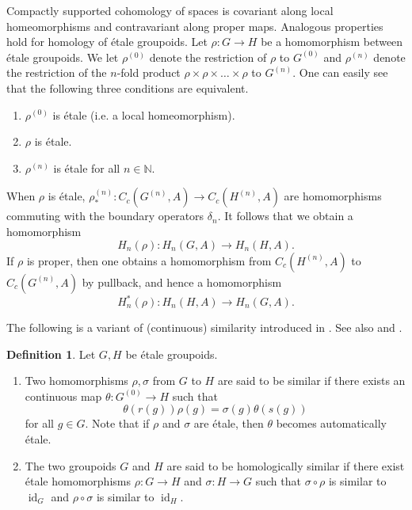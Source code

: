 \documentclass[11pt]{article}
\theoremstyle{definition}
\newtheorem{df}[thm]{Definition}
\newcommand{\id}{\operatorname{id}}
\newcommand{\N}{\mathbb{N}}
\begin{document}
Compactly supported cohomology of spaces is 
covariant along local homeomorphisms and contravariant along proper maps. 
Analogous properties hold for homology of \'etale groupoids. 
Let $\rho:G\to H$ be a homomorphism between \'etale groupoids. 
We let $\rho^{(0)}$ denote the restriction of $\rho$ to $G^{(0)}$ and 
$\rho^{(n)}$ denote the restriction of the $n$-fold product 
$\rho\times\rho\times\dots\times\rho$ to $G^{(n)}$. 
One can easily see that the following three conditions are equivalent. 
\begin{enumerate}
\item $\rho^{(0)}$ is \'etale (i.e. a local homeomorphism). 
\item $\rho$ is \'etale. 
\item $\rho^{(n)}$ is \'etale for all $n\in\N$. 
\end{enumerate}
When $\rho$ is \'etale, 
$\rho^{(n)}_*:C_c(G^{(n)},A)\to C_c(H^{(n)},A)$ are homomorphisms 
commuting with the boundary operators $\delta_n$. 
It follows that we obtain a homomorphism 
\[
H_n(\rho):H_n(G,A)\to H_n(H,A). 
\]
If $\rho$ is proper, then 
one obtains a homomorphism from $C_c(H^{(n)},A)$ to $C_c(G^{(n)},A)$ 
by pullback, and hence a homomorphism 
\[
H^*_n(\rho):H_n(H,A)\to H_n(G,A). 
\]

The following is a variant of (continuous) similarity introduced in \cite{R1}. 
See also \cite[Proposition 3.8]{CM} and \cite[2.1.3]{FHK}. 

\begin{df}\label{similarity}
Let $G,H$ be \'etale groupoids. 
\begin{enumerate}
\item Two homomorphisms $\rho,\sigma$ from $G$ to $H$ are 
said to be similar 
if there exists an continuous map $\theta:G^{(0)}\to H$ such that 
\[
\theta(r(g))\rho(g)=\sigma(g)\theta(s(g))
\]
for all $g\in G$. 
Note that if $\rho$ and $\sigma$ are \'etale, then 
$\theta$ becomes automatically \'etale. 
\item The two groupoids $G$ and $H$ are said to be homologically similar 
if there exist \'etale homomorphisms $\rho:G\to H$ and $\sigma:H\to G$ 
such that $\sigma\circ\rho$ is similar to $\id_G$ and 
$\rho\circ\sigma$ is similar to $\id_H$. 
\end{enumerate}
\end{df}
\end{document}
